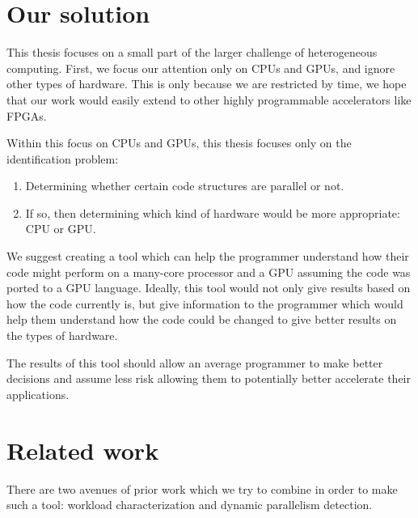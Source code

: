 \documentclass[12pt,twoside]{reedthesis}
\begin{document}
		
	
	\section{Our solution}
	
		This thesis focuses on a small part of the larger challenge of heterogeneous computing. First, we focus our attention only on CPUs and GPUs, and ignore other types of hardware. This is only because we are restricted by time, we hope that our work would easily extend to other highly programmable accelerators like FPGAs.
		
		
		Within this focus on CPUs and GPUs, this thesis focuses only on the identification problem: 
		
		\begin{enumerate}
			\item Determining whether certain code structures are parallel or not.
			\item If so, then determining which kind of hardware would be more appropriate: CPU or GPU. 
		\end{enumerate}
	
		We suggest creating a tool which can help the programmer understand how their code might perform on a many-core processor and a GPU assuming the code was ported to a GPU language. %
		Ideally, this tool would not only give results based on how the code currently is, but give information to the programmer which would help them understand how the code could be changed to give better results on the types of hardware. 
		
		The results of this tool should allow an average programmer to make better decisions and assume less risk allowing them to potentially better accelerate their applications. 
		
	\section{Related work}
	
		There are two avenues of prior work which we try to combine in order to make such a tool: workload characterization and dynamic parallelism detection. 
		
\end{document}
